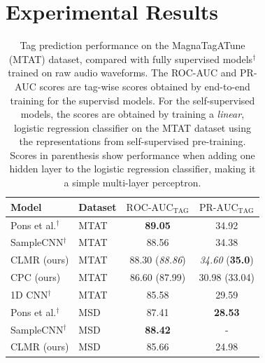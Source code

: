 \chapter{Experimental Results}\label{sec:results}
\begin{table}[t]
    \centering
    \begin{tabular}{@{}llcc@{}}\toprule
        Model & Dataset & $\text{ROC-AUC}_\text{TAG}$ & $\text{PR-AUC}_\text{TAG}$ \\ \midrule
        Pons et al.$^\dagger$ & MTAT & \textbf{89.05} & 34.92 \\
        SampleCNN$^\dagger$ & MTAT & 88.56 & 34.38 \\
        CLMR (ours) & MTAT & 88.30 (\textit{88.86}) & \textit{34.60} (\textbf{35.0}) \\
        CPC (ours) & MTAT & 86.60 (87.99) & 30.98 (33.04) \\
        1D CNN$^\dagger$ & MTAT & 85.58 & 29.59 \\\midrule
        Pons et al.$^\dagger$ & MSD & 87.41 & \textbf{28.53} \\
        SampleCNN$^\dagger$ & MSD & \textbf{88.42} & - \\
        CLMR (ours) & MSD & 85.66 & 24.98 \\
        \bottomrule
    \end{tabular}
    \caption{Tag prediction performance on the MagnaTagATune (MTAT) dataset, compared with fully supervised models$^\dagger$ trained on raw audio waveforms. The ROC-AUC and PR-AUC scores are tag-wise scores obtained by end-to-end training for the supervisd models. For the self-supervised models, the scores are obtained by training a \emph{linear}, logistic regression classifier on the MTAT dataset using the representations from self-supervised pre-training. Scores in parenthesis show performance when adding one hidden layer to the logistic regression classifier, making it a simple multi-layer perceptron.}
    \label{tab:magnatagatune_results}
\end{table}

